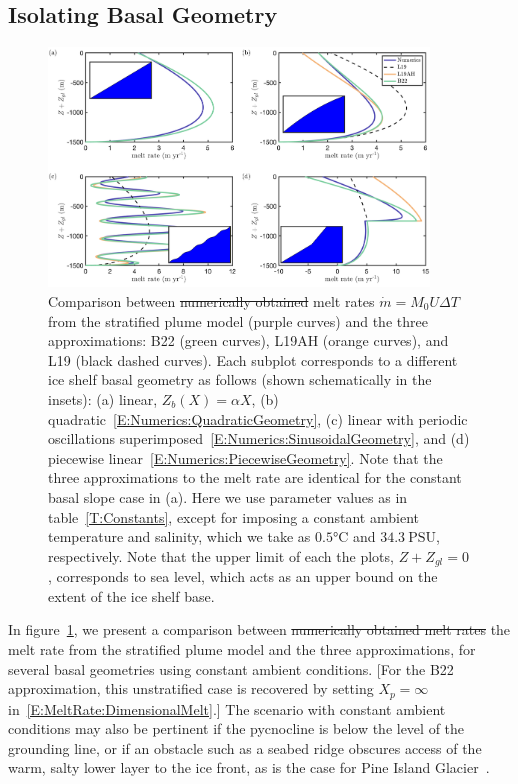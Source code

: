 \documentclass[openacc]{rsproca_new}%
\newcommand{\red}[1]{{\color{red} #1}}
\newcommand{\blue}[1]{{\color{blue} #1}}
\newcommand{\rout}[1]{\red{\st{#1}}}\newcommand{\ab}[1]{\textcolor{Green}{#1}}\newcommand{\about}[1]{\textcolor{Cyan}{\sout{#1}}}
\begin{document}
\subsection{Isolating Basal Geometry}\label{S:Numerics:NoPycnocline}
\begin{figure}
\centering
\includegraphics[width = 0.9\textwidth]{./make_plots/plots/figure6.png}
\caption{Comparison between\rout{ numerically obtained} melt rates $\dot{m}= M_0 U \Delta T$ \blue{from the stratified plume model} (purple curves) and the three approximations: B22 (green curves), L19AH (orange curves), and L19 (black dashed curves). Each subplot corresponds to a different ice shelf basal geometry as follows (shown schematically in the insets): (a) linear, $Z_b(X) = \alpha X$, (b) quadratic~\eqref{E:Numerics:QuadraticGeometry}, (c) linear with periodic oscillations superimposed~\eqref{E:Numerics:SinusoidalGeometry}, and (d) piecewise linear~\eqref{E:Numerics:PiecewiseGeometry}. Note that the three approximations to the melt rate are identical for the constant basal slope case in (a).  Here we use parameter values as in table~\ref{T:Constants}, except for imposing a constant ambient temperature and salinity, which we take as $ 0.5\si{\celsius}$ and $34.3~\text{PSU}$, respectively. Note that the upper limit of each the plots, $Z + Z_{gl} = 0$, corresponds to sea level, which acts as an upper bound on the extent of the ice shelf base.}   \label{fig:Numerics:Geometry}
\end{figure}

In figure~\ref{fig:Numerics:Geometry}, we present a comparison between \rout{numerically obtained melt rates}\blue{the melt rate from the stratified plume model} and the three approximations, for several basal geometries using constant ambient conditions. [For the B22 approximation, this unstratified case is recovered by setting $X_p = \infty$ in~\eqref{E:MeltRate:DimensionalMelt}.] The scenario with constant ambient conditions may also be pertinent if the pycnocline is below the level of the grounding line, or if an obstacle such as a seabed ridge obscures access of the warm, salty lower layer to the ice front, as is the case for Pine Island Glacier~\cite{DeRydt2014JGeophysResOceans}. 
\end{document}
